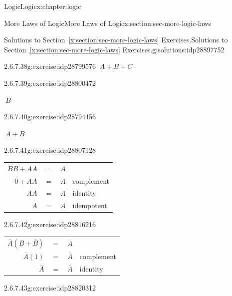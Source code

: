 \documentclass[twoside,10pt,]{book}
\newcommand{\tabularfont}{\relax}
\newcommand{\xreffont}{\relax}
\numberwithin{equation}{section}
\begin{document}
\begin{chapterptx}{Logic}{}{Logic}{}{}{x:chapter:logic}
\begin{sectionptx}{More Laws of Logic}{}{More Laws of Logic}{}{}{x:section:sec-more-logic-laws}
\begin{solutions-subsection}{Solutions to Section~{\xreffont\ref*{x:section:sec-more-logic-laws}} Exercises.}{}{Solutions to Section~{\xreffont\ref*{x:section:sec-more-logic-laws}} Exercises.}{}{}{g:solutions:idp28897752}
\begin{exercisegroup}
\begin{divisionsolutioneg}{2.6.7.38}{}{g:exercise:idp28799576}
\noindent\hypertarget{g:solution:idp28799960-main}{}\(\ A+B+C\)\end{divisionsolutioneg}%
\begin{divisionsolutioneg}{2.6.7.39}{}{g:exercise:idp28800472}%
\par\smallskip%
\noindent\hypertarget{g:solution:idp28793944-main}{}\(\ B\)\end{divisionsolutioneg}%
\begin{divisionsolutioneg}{2.6.7.40}{}{g:exercise:idp28794456}%
\par\smallskip%
\noindent\hypertarget{g:solution:idp28805464-main}{}\(\ A+B\)\end{divisionsolutioneg}%
\end{exercisegroup}
\par\medskip\noindent
\begin{exercisegroup}
\begin{divisionsolutioneg}{2.6.7.41}{}{g:exercise:idp28807128}%
\par\smallskip%
\noindent\hypertarget{g:solution:idp28808024-main}{}\begin{center}%
{\tabularfont%
\begin{tabular}{llll}
\multicolumn{1}{r}{\(B\overline{B}{}+AA\)}&\(=\)&\(A\)&\(\)\tabularnewline[0pt]
\multicolumn{1}{r}{\(0+AA\)}&\(=\)&\(A\)&complement\tabularnewline[0pt]
\multicolumn{1}{r}{\(AA\)}&\(=\)&\(A\)&identity\tabularnewline[0pt]
\multicolumn{1}{r}{\(A\)}&\(=\)&\(A\)&idempotent
\end{tabular}
}%
\end{center}%
\end{divisionsolutioneg}%
\begin{divisionsolutioneg}{2.6.7.42}{}{g:exercise:idp28816216}%
\par\smallskip%
\noindent\hypertarget{g:solution:idp28816472-main}{}\begin{center}%
{\tabularfont%
\begin{tabular}{llll}
\multicolumn{1}{r}{\(\overline{A}{}(B+\overline{B}{})\)}&\(=\)&\(\overline{A}{}\)&\tabularnewline[0pt]
\multicolumn{1}{r}{\(\overline{A}{}(1)\)}&\(=\)&\(\overline{A}{}\)&complement\tabularnewline[0pt]
\multicolumn{1}{r}{\(\overline{A}{}\)}&\(=\)&\(\overline{A}{}\)&identity
\end{tabular}
}%
\end{center}%
\end{divisionsolutioneg}%
\begin{divisionsolutioneg}{2.6.7.43}{}{g:exercise:idp28820312}%
\par\smallskip%

\end{divisionsolutioneg}
\end{exercisegroup}
\end{solutions-subsection}
\end{sectionptx}
\end{chapterptx}
\end{document}
